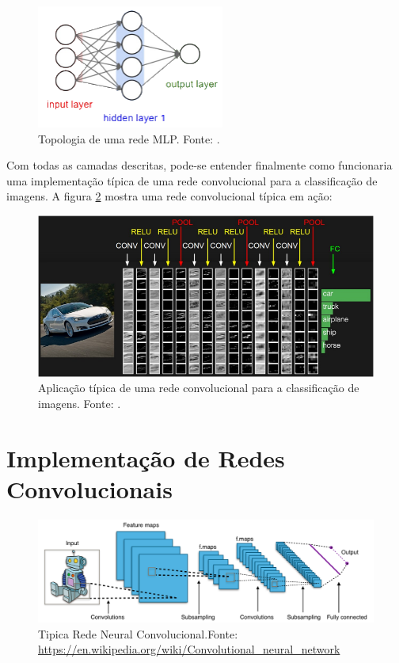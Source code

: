 \documentclass[
	12pt,				%
	oneside,			%
	a4paper,			%
	english,			%
	french,				%
	spanish,			%
	brazil,				%
	]{abntex2}
\begin{document}
\begin{figure}[H]
	\centering
	\includegraphics[width=.4\textwidth]{imagens/MLP1}
	\caption{Topologia de uma rede MLP. Fonte: \cite{ref3}.}
	\label{topologiaMLP}
\end{figure} 

Com todas as camadas descritas, pode-se entender finalmente como funcionaria uma implementação típica de uma rede convolucional para a classificação de imagens. A figura \ref{final} mostra uma rede convolucional típica em ação:

\begin{figure}[H]
	\centering
	\includegraphics[width=.8\textwidth]{imagens/final}
	\caption{Aplicação típica de uma rede convolucional para a classificação de imagens. Fonte: \cite{ref3}.}
	\label{final}
\end{figure} 

\chapter{Implementação de Redes Convolucionais}

\begin{figure}[H]
  \centering
  \includegraphics[width=.7\textwidth]{imagens/typical_cnn}
  \caption{Tipica Rede Neural Convolucional.Fonte: \url{https://en.wikipedia.org/wiki/Convolutional_neural_network}}
  \label{typical_cnn}
\end{figure}
\end{document}
